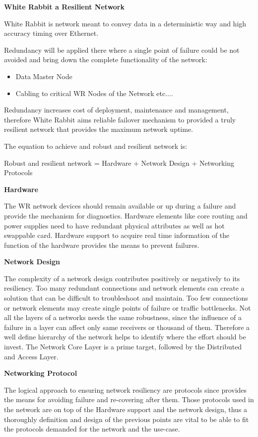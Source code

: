 \documentclass[a4paper,11pt]{article}
\begin{document}
{\Large{\textbf{White Rabbit a Resilient Network}}} 


White Rabbit is network meant to convey data in a deterministic way and high accuracy timing over Ethernet. 

Redundancy will be applied there where a single point of failure could be not avoided and bring down the complete functionality of the network:

\begin{itemize}
	\item Data Master Node
	\item Cabling to critical WR Nodes of the Network etc....
\end{itemize}

Redundancy increases cost of deployment, maintenance and management, therefore White Rabbit aims reliable failover mechanism to provided a truly resilient network that provides the maximum network uptime. 

The equation to achieve and robust and resilient network is:

\begin{center}
Robust and resilient network = Hardware + Network Design + Networking Protocols
\end{center}

\textbf{Hardware}

The WR network devices should remain available or up during a failure and provide the mechanism for diagnostics. Hardware elements like core routing and power supplies need to have redundant physical attributes as well as hot swappable card. Hardware support to acquire 
real time information of the function of the hardware provides the means to prevent failures. 


\textbf{Network Design}

The complexity of a network design contributes positively or negatively to its resiliency. Too many redundant connections and network elements can create a solution that can be difficult to troubleshoot and maintain. Too few connections or network elements may create single points of failure or traffic
bottlenecks. Not all the layers of a networks needs the same robustness, since the influence of a failure in a layer can affect only same receivers or thousand of them. Therefore a well define hierarchy of the network helps to identify where the effort should be invest. The Network Core Layer is a prime target, followed by the Distributed and Access Layer.

{\color{blue}{I'm reading constantly the "five 9s reliability" we could use the same}}

\textbf{Networking Protocol}

The logical approach to ensuring network resiliency are protocols since provides the means for avoiding failure and re-covering after them. Those protocols used in the network are on top of the Hardware support and the network design, thus a thoroughly definition and design of the previous points are vital to be able to fit the protocols demanded for the network and the use-case.
\end{document}
